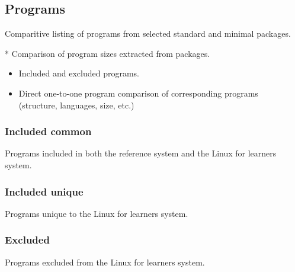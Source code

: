 \subsection{Programs}\label{Programs}

Comparitive listing of programs from selected standard and minimal packages.

* Comparison of program sizes extracted from packages.

\begin{itemize}
    \item Included and excluded programs.
    \item Direct one-to-one program comparison of corresponding programs \\(structure, languages, size, etc.)
\end{itemize}

\subsubsection{Included common}

Programs included in both the reference system and the Linux for learners system.

\subsubsection{Included unique}

Programs unique to the Linux for learners system.

\subsubsection{Excluded}

Programs excluded from the Linux for learners system.
